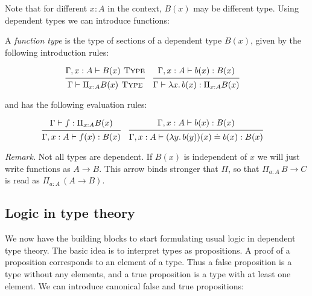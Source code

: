 \documentclass[a4paper, 12pt]{article}
\newcommand{\type}{\textsc{ Type}}
\newcommand{\la}[1]{\lambda{#1}.\,}
\theoremstyle{changedot}
\theoremstyle{changedotbreak}
\theoremstyle{nonumberplain}
\begin{document}
Note that for different $x : A$ in the context, $B(x)$ may be different type. Using dependent types we can introduce functions:

\begin{definition}
  A \textit{function type} is the type of sections of a dependent type $B(x)$, given by the following introduction rules:

  \begin{align*}
    &\begin{prooftree}
      \hypo{\Gamma, x : A \vdash B(x) \type}
      \infer1{\Gamma \vdash \Pi_{x:A} B(x) \type}
    \end{prooftree}
      &
    &\begin{prooftree}
      \hypo{\Gamma, x : A \vdash b(x) : B(x)}
      \infer1{\Gamma \vdash \la x b(x) : \Pi_{x:A} B(x)}
    \end{prooftree}
  \end{align*}

  and has the following evaluation rules:

  \begin{align*}
    &\begin{prooftree}
      \hypo{\Gamma \vdash f : \Pi_{x:A} B(x)}
      \infer1{\Gamma, x : A \vdash f(x) : B(x)}
    \end{prooftree}
    &
    &\begin{prooftree}
      \hypo{\Gamma, x : A \vdash b(x) : B(x)}
      \infer1{\Gamma, x : A \vdash (\la y b(y))(x) \doteq b(x) : B(x)}
    \end{prooftree}
  \end{align*}

\end{definition}

\textit{Remark.} Not all types are dependent. If $B(x)$ is independent of $x$ we will just write functions as $A \to B$. This arrow binds stronger that $\Pi$, so that $\Pi_{a:A}\, B \to C$ is read as $\Pi_{a:A}\, (A \to B)$.

\subsection{Logic in type theory}
We now have the building blocks to start formulating usual logic in dependent type theory. The basic idea is to interpret types as propositions. A proof of a proposition corresponds to an element of a type. Thus a false proposition is a type without any elements, and a true proposition is a type with at least one element. We can introduce canonical false and true propositions:
\end{document}
